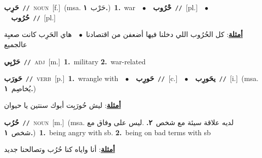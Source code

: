 \documentclass[10pt,a4paper,twoside]{article} %
\begin{document}
\begin{multicols}{2}
{\setlength\topsep{0pt}\textbf{\foreignlanguage{arabic}{حَرِب}}\ {\color{gray}\texttt{//}\color{black}}\ \textsc{noun}\ [f.]\ \color{gray}(msa. \foreignlanguage{arabic}{حَرْب}~\foreignlanguage{arabic}{\textbf{١.}})\color{black}\ \textbf{1.}~war\ \ $\bullet$\ \ \setlength\topsep{0pt}\textbf{\foreignlanguage{arabic}{حْرُوب}}\ {\color{gray}\texttt{//}\color{black}}\ [pl.]\ \ $\bullet$\ \ \setlength\topsep{0pt}\textbf{\foreignlanguage{arabic}{حُرُوب}}\ {\color{gray}\texttt{//}\color{black}}\ [pl.]\  \begin{flushright}\color{gray}\foreignlanguage{arabic}{\textbf{\underline{\foreignlanguage{arabic}{أمثلة}}}: كل الحُرُوب اللي دخلنا فيها أضعفن من اقتصادنا\ $\bullet$\ \  هاي الحَرِب كانت صعبِة عالجميع}\end{flushright}\color{black}} \vspace{2mm}

{\setlength\topsep{0pt}\textbf{\foreignlanguage{arabic}{حَرْبِي}}\ {\color{gray}\texttt{//}\color{black}}\ \textsc{adj}\ [m.]\ \textbf{1.}~military  \textbf{2.}~war-related\ } \vspace{2mm}

{\setlength\topsep{0pt}\textbf{\foreignlanguage{arabic}{حَورَب}}\ {\color{gray}\texttt{//}\color{black}}\ \textsc{verb}\ [p.]\ \textbf{1.}~wrangle with\ \ $\bullet$\ \ \setlength\topsep{0pt}\textbf{\foreignlanguage{arabic}{حَورِب}}\ {\color{gray}\texttt{//}\color{black}}\ [c.]\ \ $\bullet$\ \ \setlength\topsep{0pt}\textbf{\foreignlanguage{arabic}{يحَورِب}}\ {\color{gray}\texttt{//}\color{black}}\ [i.]\ \color{gray}(msa. \foreignlanguage{arabic}{يُخاصِم}~\foreignlanguage{arabic}{\textbf{١.}})\color{black}\  \begin{flushright}\color{gray}\foreignlanguage{arabic}{\textbf{\underline{\foreignlanguage{arabic}{أمثلة}}}: ليش حُورَبِت أبوك سنتين يا حيوان}\end{flushright}\color{black}} \vspace{2mm}

{\setlength\topsep{0pt}\textbf{\foreignlanguage{arabic}{حُرُب}}\ {\color{gray}\texttt{//}\color{black}}\ \textsc{noun}\ [m.]\ \color{gray}(msa. \foreignlanguage{arabic}{لديه علاقة سيئة مع شخص}~\foreignlanguage{arabic}{\textbf{٢.}}  .\foreignlanguage{arabic}{ليس على وفاق مع شخص}~\foreignlanguage{arabic}{\textbf{١.}})\color{black}\ \textbf{1.}~being angry with sb.  \textbf{2.}~being on bad terms with sb\  \begin{flushright}\color{gray}\foreignlanguage{arabic}{\textbf{\underline{\foreignlanguage{arabic}{أمثلة}}}: أنا واياه كنا حُرُب وتصالحنا جديد}\end{flushright}\color{black}} \vspace{2mm}


\end{multicols}
\end{document}

